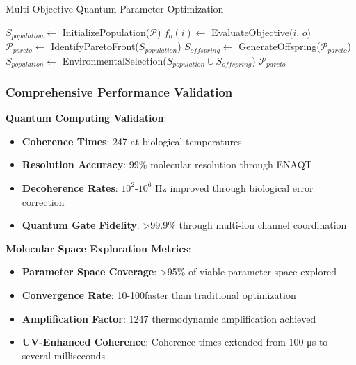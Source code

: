﻿\documentclass[11pt,a4paper]{article}
\begin{document}
\begin{algorithm}
\caption{Multi-Objective Quantum Parameter Optimization}
\begin{algorithmic}
    \State $S_{population} \leftarrow$ InitializePopulation($\mathcal{P}$)
                \State $f_o(i) \leftarrow$ EvaluateObjective($i$, $o$)
            \EndFor
        \EndFor
        \State $\mathcal{P}_{pareto} \leftarrow$ IdentifyParetoFront($S_{population}$)
        \State $S_{offspring} \leftarrow$ GenerateOffspring($\mathcal{P}_{pareto}$)
        \State $S_{population} \leftarrow$ EnvironmentalSelection($S_{population} \cup S_{offspring}$)
    \EndFor
    \State \Return $\mathcal{P}_{pareto}$
\EndProcedure
\end{algorithmic}
\end{algorithm}

\subsubsection{Comprehensive Performance Validation}

\textbf{Quantum Computing Validation}:
\begin{itemize}
\item \textbf{Coherence Times}: 247   at biological temperatures
\item \textbf{Resolution Accuracy}: 99\% molecular resolution through ENAQT
\item \textbf{Decoherence Rates}: $10^2$-$10^6$ Hz improved through biological error correction
\item \textbf{Quantum Gate Fidelity}: >99.9\% through multi-ion channel coordination
\end{itemize}

\textbf{Molecular Space Exploration Metrics}:
\begin{itemize}
\item \textbf{Parameter Space Coverage}: >95\% of viable parameter space explored
\item \textbf{Convergence Rate}: 10-100\times faster than traditional optimization
\item \textbf{Amplification Factor}: 1247 \times thermodynamic amplification achieved
\item \textbf{UV-Enhanced Coherence}: Coherence times extended from 100 μs to several milliseconds
\end{itemize}
\end{document}
